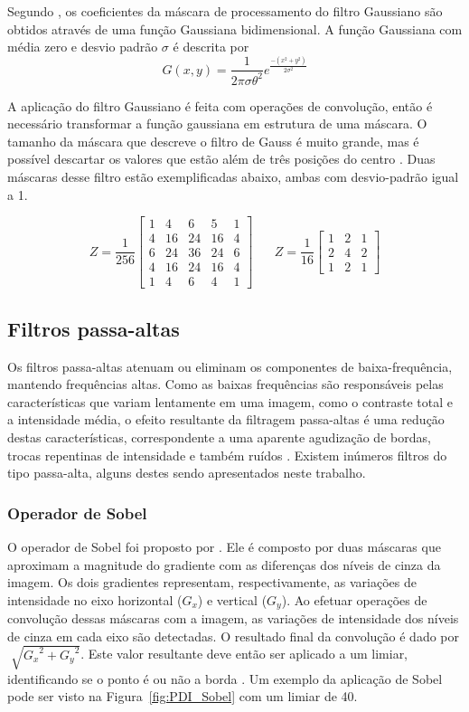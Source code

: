 \documentclass[12pt,oneside,a4paper,english,french,spanish,brazil,]{abntex2}
\begin{document}
Segundo \citet{pedrini:2008}, os coeficientes da máscara de processamento do filtro Gaussiano são obtidos através de uma função Gaussiana bidimensional. A função Gaussiana com média zero e desvio padrão \(\sigma\) é descrita por \[G(x,y)=\frac{1}{2\pi\sigma\theta^2} e^{\frac{-(x^2+y^2)}{2\sigma^2}  }\]

A aplicação do filtro Gaussiano é feita com operações de convolução, então é necessário transformar a função gaussiana em estrutura de uma máscara. O tamanho da máscara que descreve o filtro de Gauss é muito grande, mas é possível descartar os valores que estão além de três posições do centro \cite{conci:2003}. Duas máscaras desse filtro estão exemplificadas abaixo, ambas com desvio-padrão igual a 1.

\[Z=\frac{1}{256}\begin{bmatrix}
1 & 4 & 6 & 5 & 1\\ 
4 & 16 & 24 & 16 & 4\\ 
6 & 24 & 36 & 24 & 6\\ 
4 & 16 & 24 & 16 & 4\\ 
1 & 4 & 6 & 4 & 1
\end{bmatrix}
\; \; \; \; \; \; 
Z=\frac{1}{16}\begin{bmatrix}
1 & 2 & 1\\ 
2 & 4 & 2\\ 
1 & 2 & 1
\end{bmatrix}
\]

\subsection{Filtros passa-altas}

Os filtros passa-altas atenuam ou eliminam os componentes de baixa-frequência, mantendo frequências altas. Como as baixas frequências são responsáveis pelas características que variam lentamente em uma imagem, como o contraste total e a intensidade média, o efeito resultante da filtragem passa-altas é uma redução destas características, correspondente a uma aparente agudização de bordas, trocas repentinas de intensidade e também ruídos \cite{gonzalez:2012}. Existem inúmeros filtros do tipo passa-alta, alguns destes sendo apresentados neste trabalho.

\subsubsection{Operador de Sobel}

O operador de Sobel foi proposto por \citet{sobel:1968}. Ele é composto por duas máscaras que aproximam a magnitude do gradiente com as diferenças dos níveis de cinza da imagem. Os dois gradientes representam, respectivamente, as variações de intensidade no eixo horizontal (\(G_x\)) e vertical (\(G_y\)). Ao efetuar operações de convolução dessas máscaras com a imagem, as variações de intensidade dos níveis de cinza em cada eixo são detectadas. O resultado final da convolução é dado por \(\sqrt[]{{G_x}^2 + {G_y}^2}\). Este valor resultante deve então ser aplicado a um limiar, identificando se o ponto é ou não a borda \cite{pedrini:2008}. Um exemplo da aplicação de Sobel pode ser visto na Figura~\ref{fig:PDI_Sobel} com um limiar de 40.
\end{document}
